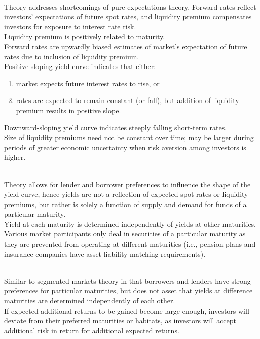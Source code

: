\begin{remark} \\
Theory addresses shortcomings of pure expectations theory. Forward rates reflect investors' expectations of future spot rates, and liquidity premium compensates investors for exposure to interest rate risk.\\
Liquidity premium is positively related to maturity.\\
Forward rates are upwardly biased estimates of market's expectation of future rates due to inclusion of liquidity premium.\\
Positive-sloping yield curve indicates that either:
\begin{enumerate}[label=\roman*.]
\setlength{\itemsep}{0pt}
\item market expects future interest rates to rise, or
\item rates are expected to remain constant (or fall), but addition of liquidity premium results in positive slope.
\end{enumerate}
Downward-sloping yield curve indicates steeply falling short-term rates.\\
Size of liquidity premiums need not be constant over time; may be larger during periods of greater economic uncertainty when risk aversion among investors is higher.
\end{remark}

\begin{remark} \\
Theory allows for lender and borrower preferences to influence the shape of the yield curve, hence yields are not a reflection of expected spot rates or liquidity premiums, but rather is solely a function of supply and demand for funds of a particular maturity.\\
Yield at each maturity is determined independently of yields at other maturities.\\
Various market participants only deal in securities of a particular maturity as they are prevented from operating at different maturities (i.e., pension plans and insurance companies have asset-liability matching requirements).
\end{remark}

\begin{remark} \\
Similar to segmented markets theory in that borrowers and lenders have strong preferences for particular maturities, but does not asset that yields at difference maturities are determined independently of each other.\\
If expected additional returns to be gained become large enough, investors will deviate from their preferred maturities or habitats, as investors will accept additional risk in return for additional expected returns. 
\end{remark}

